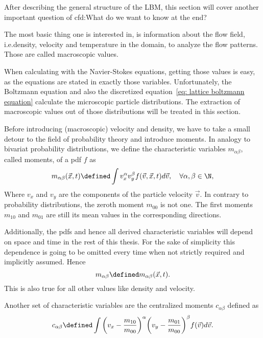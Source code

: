 After describing the general structure of the LBM, this section will cover another important question of \gls{cfd}:\@ What do we want to know at the end?

The most basic thing one is interested in, is information about the flow field, i.e.\@ density, velocity and temperature in the domain, to analyze the flow patterns.
Those are called macroscopic values.

When calculating with the Navier-Stokes equations, getting those values is easy, as the equations are stated in exactly those variables.
Unfortunately, the Boltzmann equation and also the discretized equation~\eqref{eq: lattice boltzmann equation} calculate the microscopic particle distributions.
The extraction of macroscopic values out of those distributions will be treated in this section.

Before introducing (macroscopic) velocity and density, we have to take a small detour to the field of probability theory and introduce moments.
In analogy to bivariat probability distributions, we define the characteristic variables $m_{\alpha\beta}$, called moments, of a \gls{pdf} $f$ as
\begin{equation}
  \label{eq: moments continuous}
  m_{\alpha\beta}(\vec{x},t) \defined  \int v_x^\alpha v_y^\beta f(\vec{v},\vec{x},t) d\vec{v},\quad\forall\alpha,\beta\in\N,
\end{equation}
Where $v_x$ and $v_y$ are the components of the particle velocity $\vec{v}$.
In contrary to probability distributions, the zeroth moment $m_{00}$ is not one. The first moments $m_{10}$ and $m_{01}$ are still its mean values in the corresponding directions.

Additionally, the \glspl{pdf} and hence all derived characteristic variables will depend on space and time in the rest of this thesis. For the sake of simplicity this dependence is going to be omitted every time when not strictly required and implicitly assumed. Hence
\begin{equation}
  \label{eq: leave out x and y}
  m_{\alpha\beta} \defined m_{\alpha\beta}(\vec{x},t).
\end{equation}
This is also true for all other values like density and velocity.

Another set of characteristic variables are the centralized moments $c_{\alpha\beta}$ defined as
\begin{equation}
  \label{eq: central moments continuous}
  c_{\alpha\beta} \defined \int {\left(v_x - \frac{m_{10}}{m_{00}}\right)}^\alpha {\left(v_y-\frac{m_{01}}{m_{00}}\right)}^\beta f(\vec{v})  d\vec{v}.
\end{equation}

